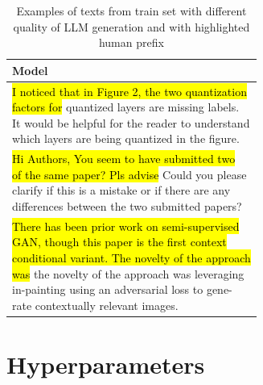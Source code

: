 \documentclass[11pt]{article}
\DeclareRobustCommand{\hlcyan}[1]{{\sethlcolor{cyan!20}\hl{#1}}}
\begin{document}
\begin{table}[ht!]
\centering
\begin{tabular}{l}
\hline
\textbf{Model}\\
\hline
\makecell{\hlcyan{I noticed that in Figure 2, the two quantization} \\ \hlcyan{factors for} quantized layers are missing labels.  \\  It would be helpful for the reader to understand \\  which layers are being quantized in the figure}. \\
\hline
\makecell{\hlcyan{Hi Authors, You seem to have submitted two} \\
\hlcyan{of the same paper? Pls advise} Could you please \\ clarify if this  is a mistake or if there are any \\  differences between the two submitted papers?} \\
\hline
\makecell{\hlcyan{There has been prior work on semi-supervised} \\ \hlcyan{GAN, though this paper is the first context} \\ \hlcyan{conditional variant. The novelty of the approach} \\  \hlcyan{was}
the novelty of the approach was  leveraging \\  in-painting using an adversarial loss to  gene- \\ rate contextually relevant images. } \\
\hline
\end{tabular}
\caption{Examples of texts from train set with different quality of LLM generation and with highlighted human prefix}
\label{tab:examples}
\end{table}

\section{Hyperparameters}
\label{appendix:hyperparameters}
\end{document}
